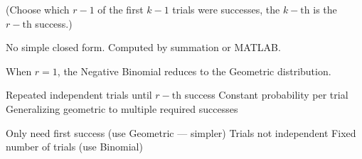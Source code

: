 

(Choose which $r-1$ of the first $k-1$ trials were successes, the $k-\mathrm{th}$ is the $r-\mathrm{th}$ success.)


No simple closed form. Computed by summation or MATLAB.






When $r = 1$, the Negative Binomial reduces to the Geometric distribution.


\PSyes{} Repeated independent trials until $r-\mathrm{th}$ success\PSbr{}\PSyes{} Constant probability per trial\PSbr{}\PSyes{} Generalizing geometric to multiple required successes


\PSno{} Only need first success (use Geometric — simpler)\PSbr{}\PSno{} Trials not independent\PSbr{}\PSno{} Fixed number of trials (use Binomial)



